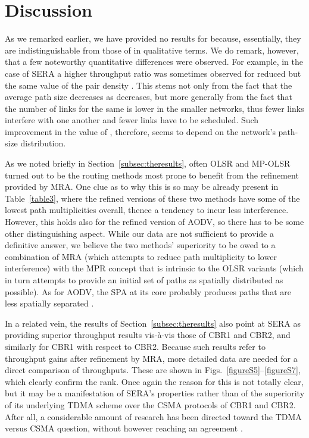 \documentclass{article}
\begin{document}
\section{Discussion}\label{sec:discussion}

As we remarked earlier, we have provided no results for 
because, essentially, they are indistinguishable from those of  in
qualitative terms. We do remark, however, that a few noteworthy quantitative
differences were observed. For example, in the case of SERA a higher throughput
ratio  was sometimes observed for reduced  but the same value of the
pair density . This stems not only from the fact that the average path
size decreases as  decreases, but more generally from the fact that the
number of links for the same  is lower in the smaller networks, thus
fewer links interfere with one another and fewer links have to be scheduled.
Such improvement in the value of , therefore, seems to depend on the
network's path-size distribution.

As we noted briefly in Section~\ref{subsec:theresults}, often OLSR and MP-OLSR
turned out to be the routing methods most prone to benefit from the refinement
provided by MRA. One clue as to why this is so may be already present in
Table~\ref{table3}, where the refined versions of these two methods have some
of the lowest path multiplicities overall, thence a tendency to incur less
interference. However, this holds also for the refined version of AODV, so there
has to be some other distinguishing aspect. While our data are not sufficient to
provide a definitive answer, we believe the two methods' superiority to be owed
to a combination of MRA (which attempts to reduce path multiplicity to lower
interference) with the MPR concept that is intrinsic to the OLSR variants (which
in turn attempts to provide an initial set of paths as spatially distributed as
possible). As for AODV, the SPA at its core probably produces paths that are
less spatially separated \cite{Jiazi2008,Biradar2010}.

In a related vein, the results of Section~\ref{subsec:theresults} also point at
SERA as providing superior throughput results vis-\`{a}-vis those of CBR1 and
CBR2, and similarly for CBR1 with respect to CBR2. Because such results refer to
throughput gains after refinement by MRA, more detailed data are needed for a
direct comparison of throughputs. These are shown in
Figs.~\ref{figureS5}--\ref{figureS7}, which clearly confirm the rank. Once again
the reason for this is not totally clear, but it may be a manifestation of
SERA's properties rather than of the superiority of its underlying TDMA scheme
over the CSMA protocols of CBR1 and CBR2. After all, a considerable amount of
research has been directed toward the TDMA versus CSMA question, without however
reaching an agreement
\cite{Ding2002,Gupta2007,Ashutosh2009,Banaouas2009}.
\end{document}
